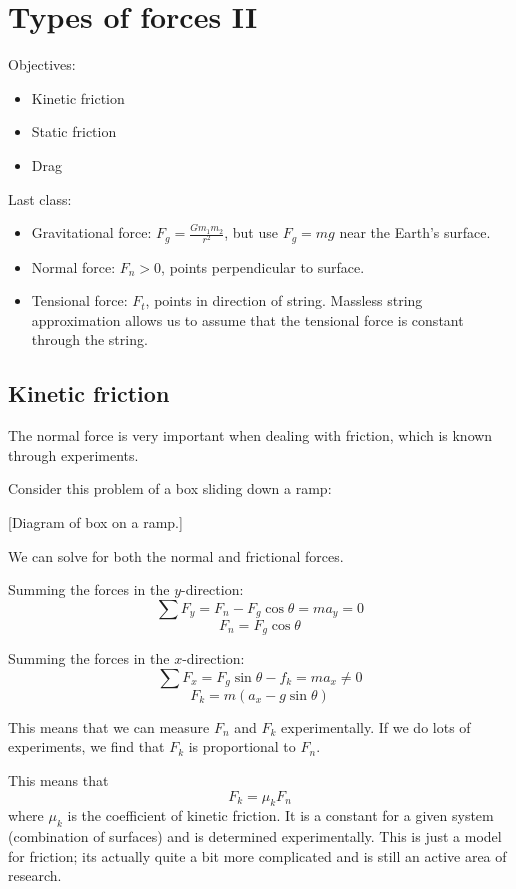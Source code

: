 \section{Types of forces II}
Objectives:
\begin{itemize}
\item Kinetic friction
\item Static friction
\item Drag
\end{itemize}

Last class:
\begin{itemize}
\item Gravitational force: $F_g=\frac{Gm_1m_2}{r^2}$, but use $F_g=mg$ near the Earth's surface.
\item Normal force: $F_n>0$, points perpendicular to surface.
\item Tensional force: $F_t$, points in direction of string. Massless string approximation allows us to assume that the tensional force is constant through the string.
\end{itemize}

\subsection{Kinetic friction}
The normal force is very important when dealing with friction, which is known through experiments.

Consider this problem of a box sliding down a ramp:

[Diagram of box on a ramp.]
\vspace{5cm}

We can solve for both the normal and frictional forces.

Summing the forces in the $y$-direction:
$$\sum F_y = F_n-F_g\cos\theta=ma_y=0$$
$$F_n=F_g\cos\theta$$

Summing the forces in the $x$-direction:
$$\sum F_x=F_g\sin\theta-f_k=ma_x\neq 0$$
$$F_k=m(a_x-g\sin\theta)$$

This means that we can measure $F_n$ and $F_k$ experimentally. If we do lots of experiments, we find that $F_k$ is proportional to $F_n$.

\vspace{5cm}


This means that
$$\boxed{ F_k = \mu_k F_n}$$
where $\mu_k$ is the coefficient of kinetic friction. It is a constant for a given system (combination of surfaces) and is determined experimentally. This is just a model for friction; its actually quite a bit more complicated and is still an active area of research.

